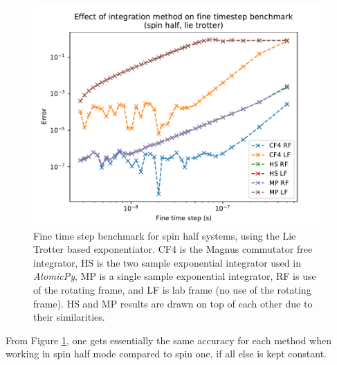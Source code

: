 \documentclass{jors}
\begin{document}
			\begin{figure}[h!]
				\includegraphics[scale=0.9]{benchmark_comparison_spin_half_lt_publication.pdf}
				\caption{Fine time step benchmark for spin half systems, using the Lie Trotter based exponentiator. CF4 is the Magnus commutator free integrator, HS is the two sample exponential integrator used in \emph{AtomicPy}, MP is a single sample exponential integrator, RF is use of the rotating frame, and LF is lab frame (no use of the rotating frame). HS and MP results are drawn on top of each other due to their similarities.}
				\label{fig:benchmark_comparison_spin_half_lt}
			\end{figure}

			From Figure \ref{fig:benchmark_comparison_spin_half_lt}, one gets essentially the same accuracy for each method when working in spin half mode compared to spin one, if all else is kept constant.\\
\end{document}
